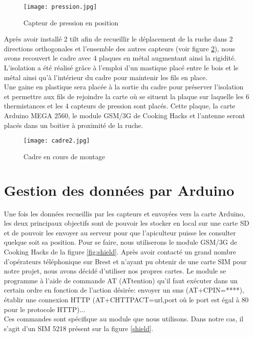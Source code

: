 \clearpage

\begin{figure}[h!]
\centering\texttt{[image: pression.jpg]}
\caption{\label{fig:pression2} Capteur de pression en position}
\end{figure}

Après avoir installé 2 tilt afin de recueillir le déplacement de la ruche dans 2 directions orthogonales et l'ensemble des autres capteurs (voir figure \ref{fig:cadre2}), nous avons recouvert le cadre avec 4 plaques en métal augmentant ainsi la rigidité. L'isolation a été réalisé grâce à l'emploi d'un mastique placé entre le bois et le métal ainsi qu'à l'intérieur du cadre pour maintenir les fils en place. \\
Une gaine en plastique sera placée à la sortie du cadre pour préserver l'isolation et permettre aux fils de rejoindre la carte où se situent la plaque sur laquelle les 6 thermistances et les 4 capteurs de pression sont placés. Cette plaque, la carte Arduino MEGA 2560, le module GSM/3G de Cooking Hacks et l'antenne seront placés dans un boitier à proximité de la ruche.     

\begin{figure}[h!]
\centering\texttt{[image: cadre2.jpg]}
\caption{\label{fig:cadre2} Cadre en cours de montage}
\end{figure}

\clearpage

\section{Gestion des données par Arduino}

Une fois les données recueillis par les capteurs et envoyées vers la carte Arduino, les deux principaux objectifs sont de pouvoir les stocker en local sur une carte SD et de pouvoir les envoyer au serveur pour que l'apiculteur puisse les consulter quelque soit sa position. Pour se faire, nous utiliserons le module GSM/3G de Cooking Hacks de la figure \ref{fig:shield}. Après avoir contacté un grand nombre d'opérateurs téléphonique sur Brest et n'ayant pu obtenir de une carte SIM pour notre projet, nous avons décidé d'utiliser nos propres cartes. 
Le module se programme à l'aide de commande AT (ATtention) qu'il faut exécuter dans un certain ordre en fonction de l'action désirée: envoyer un sms (AT+CPIN=****), établir une connexion HTTP (AT+CHTTPACT=url,port où le port est égal à 80 pour le protocole HTTP)...\\ 
Ces commandes sont spécifique au module que nous utilisons. Dans notre cas, il s'agit d'un SIM 5218 présent sur la figure \ref{shield}.

